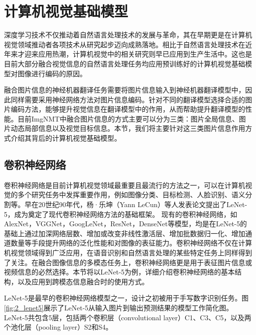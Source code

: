 \section{计算机视觉基础模型}
\label{sec:2_cv}

深度学习技术不仅推动着自然语言处理技术的发展与革命，其在早期更是在计算机视觉领域推动者各项技术从研究起步迈向成熟落地。相比于自然语言处理技术在近年来才迎来应用热潮，计算机视觉中的相关研究则早已应用到生产生活中。这也是目前大部分融合视觉信息的自然语言处理任务均应用预训练好的计算机视觉基础模型对图像进行编码的原因。

融合图片信息的神经机器翻译任务需要将图片信息输入到神经机器翻译模型中，因此同样需要采用神经网络方法对图片信息编码。针对不同的翻译模型选择合适的图片编码方法，能够提升视觉信息在翻译模型中的作用，从而帮助提升翻译模型的性能。目前ImgNMT中融合图片信息的方式主要可以分为三类：图片全局信息、图片动态局部信息以及视觉目标信息。本节，我们将主要针对这三类图片信息作用方式介绍其背后的计算机视觉基础模型。


\subsection{卷积神经网络}
\label{sec:2_cnn}

卷积神经网络是目前计算机视觉领域最重要且最流行的方法之一，可以在计算机视觉的多个研究任务中发挥重要作用，例如图像分类、目标检测、人脸识别、语义分割等。早在20世纪90年代，杨·乐坤（Yann LeCun）等人发表论文提出了LeNet-5，成为奠定了现代卷积神经网络方法的基础框架\cite{fukushima1980neocognitron,DBLP:journals/pieee/LeCunBBH98,lecun1989handwritten}。
现有的卷积神经网络，如AlexNet\cite{DBLP:conf/nips/KrizhevskySH12}，VGGNet\cite{DBLP:journals/corr/SimonyanZ14a}，GoogLeNet\cite{DBLP:journals/corr/SzegedyLJSRAEVR14}，ResNet\cite{32_DBLP:conf/cvpr/HeZRS16}，DenseNet\cite{DBLP:conf/cvpr/HuangLMW17}等模型，均是在LeNet-5的基础上通过加深网络层数、增加或改变非线性激活层、增加批数据归一化、增加通道数量等手段提升网络的泛化性能和对图像的表征能力。卷积神经网络不仅在计算机视觉领域得到广泛应用，在语音识别和自然语言处理的某些特定任务上同样得到了关注。在融合图像信息的多模态任务上，卷积神经网络更是用于表征图片信息或视频信息的必然选择。本节将以LeNet-5为例，详细介绍卷积神经网络的基本结构，以及应用到跨模态信息融合时的使用方式。


LeNet-5是最早的卷积神经网络模型之一，设计之初被用于手写数字识别任务。图\ref{fig:2_lenet5}展示了LeNet-5从输入图片到输出预测结果的模型工作简化图。LeNet-5共包含5层，包括两个卷积层（convolutional layer）C1、C3、C5，以及两个池化层（pooling layer）S2和S4。

